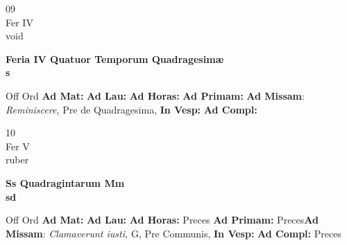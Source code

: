 \documentclass[10pt, openany]{book}
\begin{document}
    \begin{center}
        \begin{minipage}{3.5in}
            \vspace{2em}
            \begin{minipage}{0.5in}
                {\Huge 09} \\
                {\normalsize Fer IV} \\
                {\normalsize void}
            \end{minipage}
            \begin{minipage}{3.0in}
                \textbf{ \large Feria IV Quatuor Temporum Quadragesimæ \\
                \textnormal{\normalsize s}} \\ 
            \end{minipage}
            \begin{justify}Off Ord
                \textbf{Ad Mat: }
                \textbf{Ad Lau: }
                \textbf{Ad Horas: }
                \textbf{Ad Primam: }\textbf{Ad Missam}: \textit{Reminiscere,} Pre de Quadragesima,  
                \textbf{In Vesp: }
                \textbf{Ad Compl: }
            \end{justify}
        \end{minipage}
    \end{center}

    \begin{center}
        \begin{minipage}{3.5in}
            \vspace{2em}
            \begin{minipage}{0.5in}
                {\Huge 10} \\
                {\normalsize Fer V} \\
                {\normalsize ruber}
            \end{minipage}
            \begin{minipage}{3.0in}
                \textbf{ \large Ss Quadragintarum Mm \\
                \textnormal{\normalsize sd}} \\ 
            \end{minipage}
            \begin{justify}Off Ord
                \textbf{Ad Mat: }
                \textbf{Ad Lau: }
                \textbf{Ad Horas: }Preces
                \textbf{Ad Primam: }Preces\textbf{Ad Missam}: \textit{Clamaverunt iusti,} G, Pre Communis,  
                \textbf{In Vesp: }
                \textbf{Ad Compl: }Preces
            \end{justify}
        \end{minipage}
    \end{center}
\end{document}
